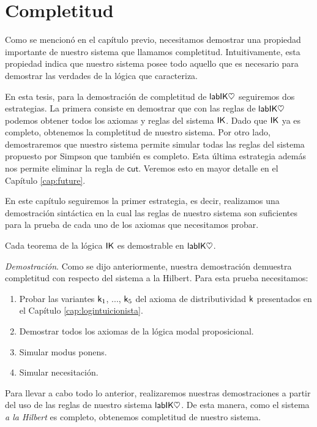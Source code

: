 \chapter{Completitud}
\label{cap:completeness}
Como se mencionó en el capítulo previo, necesitamos demostrar una propiedad importante de nuestro sistema que llamamos completitud. Intuitivamente, esta propiedad indica que nuestro sistema posee todo aquello que es necesario para demostrar las verdades de la lógica que caracteriza.

En esta tesis, para la demostración de completitud de $\mathsf{labIK\heartsuit}$ seguiremos dos estrategias. La primera consiste en demostrar que con las reglas de $\mathsf{labIK\heartsuit}$ podemos obtener todos los axiomas y reglas del sistema $\mathsf{IK}$. Dado que $\mathsf{IK}$ ya es completo, obtenemos la completitud de nuestro sistema. Por otro lado, demostraremos que nuestro sistema permite simular todas las reglas del sistema propuesto por Simpson \cite{simpson1994} que también es completo. Esta última estrategia además nos permite eliminar la regla de $\mathsf{cut}$. Veremos esto en mayor detalle en el Capítulo \ref{cap:future}.

En este capítulo seguiremos la primer estrategia, es decir, realizamos una demostración sintáctica en la cual las reglas de nuestro sistema son suficientes para la prueba de cada uno de los axiomas que necesitamos probar.

\begin{teo} Cada teorema de la lógica $\mathsf{IK}$ es demostrable en $\mathsf{labIK\heartsuit}$.
\end{teo}
\emph{Demostración}. Como se dijo anteriormente, nuestra demostración demuestra completitud con respecto del sistema a la Hilbert. Para esta prueba necesitamos:
\begin{enumerate}
	\item Probar las variantes $\mathsf{k}_{1}$, ..., $\mathsf{k}_{5}$ del axioma de distributividad $\mathsf{k}$ presentados en el Capítulo \ref{cap:logintuicionista}.
	\item Demostrar todos los axiomas de la lógica modal proposicional.
	\item Simular modus ponens.
	\item Simular necesitación.
\end{enumerate}

Para llevar a cabo todo lo anterior, realizaremos nuestras demostraciones a partir del uso de las reglas de nuestro sistema $\mathsf{labIK\heartsuit}$. De esta manera, como el sistema \emph{a la Hilbert} es completo, obtenemos completitud de nuestro sistema.

